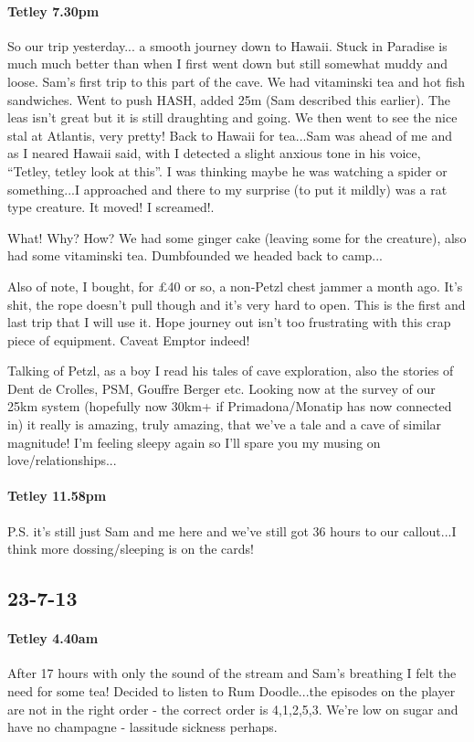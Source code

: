 \paragraph{Tetley 7.30pm}

So our trip yesterday... a smooth journey down to Hawaii. Stuck in Paradise is much much better than when I first went down but still somewhat muddy and loose. Sam’s first trip to this part of the cave. We had vitaminski tea and hot fish sandwiches. Went to push HASH, added 25m (Sam described this earlier). The leas isn’t great but it is still draughting and going. We then went to see the nice stal at Atlantis, very pretty! Back to Hawaii for tea...Sam was ahead of me and as I neared Hawaii said, with I detected a slight anxious tone in his voice, “Tetley, tetley look at this”. I was thinking maybe he was watching a spider or something...I approached and there to my surprise (to put it mildly) was a rat type creature. It moved! I screamed!. 

What! Why? How? We had some ginger cake (leaving some for the creature), also had some vitaminski tea. Dumbfounded we headed back to camp...

Also of note, I bought, for £40 or so, a non-Petzl chest jammer a month ago. It’s shit, the rope doesn't pull though and it’s very hard to open. This is the first and last trip that I will use it. Hope journey out isn’t too frustrating with this crap piece of equipment. Caveat Emptor indeed! 

Talking of Petzl, as a boy I read his tales of cave exploration, also the stories of Dent de Crolles, PSM, Gouffre Berger etc. Looking now at the survey of our 25km system (hopefully now 30km+ if Primadona/Monatip has now connected in) it really is amazing, truly amazing, that we’ve a tale and a cave of similar magnitude!
I’m feeling sleepy again so I’ll spare you my musing on love/relationships...

\paragraph{Tetley 11.58pm}
P.S. it’s still just Sam and me here and we’ve still got 36 hours to our callout...I think more dossing/sleeping is on the cards!


\subsection{23-7-13}


\paragraph{Tetley 4.40am}
After 17 hours with only the sound of the stream and Sam’s breathing I felt the need for some tea! Decided to listen to Rum Doodle...the episodes on the player are not in the right order - the correct order is 4,1,2,5,3. We’re low on sugar and have no champagne - lassitude sickness perhaps.

